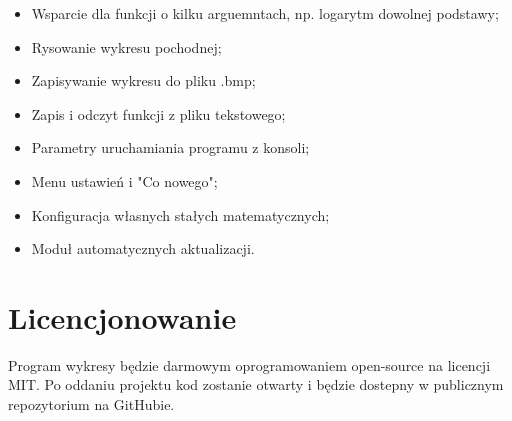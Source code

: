 \documentclass[a4paper]{article}
\begin{document}
\begin{itemize}
    \item Wsparcie dla funkcji o kilku arguemntach, np. logarytm dowolnej podstawy;
    \item Rysowanie wykresu pochodnej;
    \item Zapisywanie wykresu do pliku .bmp;
    \item Zapis i odczyt funkcji z pliku tekstowego;
    \item Parametry uruchamiania programu z konsoli;
    \item Menu ustawień i "Co nowego";
    \item Konfiguracja własnych stałych matematycznych;
    \item Moduł automatycznych aktualizacji.
\end{itemize}

\section{Licencjonowanie}

Program wykresy będzie darmowym oprogramowaniem open-source na licencji MIT. Po oddaniu projektu kod zostanie otwarty i będzie dostepny w publicznym repozytorium na GitHubie.
\end{document}
